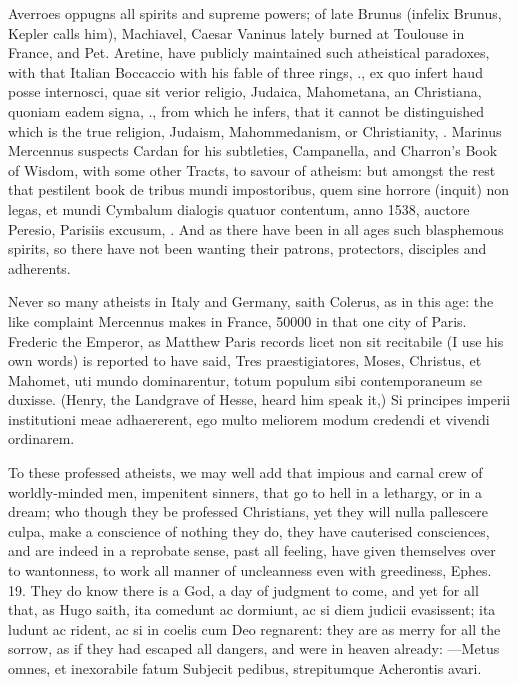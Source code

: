 {Averroes oppugns all spirits and supreme powers; of late Brunus
(infelix Brunus, Kepler calls him), Machiavel, Caesar Vaninus
lately burned at Toulouse in France, and Pet. Aretine, have publicly
maintained such atheistical paradoxes, with that Italian
Boccaccio with his fable of three rings, \etc{}., ex quo infert haud posse
internosci, quae sit verior religio, Judaica, Mahometana, an
Christiana, quoniam eadem signa, \etc{}., from which he infers, that it
cannot be distinguished which is the true religion, Judaism,
Mahommedanism, or Christianity, \etc{}. Marinus Mercennus suspects
Cardan for his subtleties, Campanella, and Charron's Book of Wisdom,
with some other Tracts, to savour of atheism: but amongst the
rest that pestilent book de tribus mundi impostoribus, quem sine
horrore (inquit) non legas, et mundi Cymbalum dialogis quatuor
contentum, anno 1538, auctore Peresio, Parisiis excusum, \etc{}. And
as there have been in all ages such blasphemous spirits, so there have
not been wanting their patrons, protectors, disciples and adherents.

Never so many atheists in Italy and Germany, saith Colerus, as in
this age: the like complaint Mercennus makes in France, 50\thinspace{}000 in that
one city of Paris. Frederic the Emperor, as Matthew Paris records
licet non sit recitabile (I use his own words) is reported to have
said, Tres praestigiatores, Moses, Christus, et Mahomet, uti mundo
dominarentur, totum populum sibi contemporaneum se duxisse. (Henry, the
Landgrave of Hesse, heard him speak it,) Si principes imperii
institutioni meae adhaererent, ego multo meliorem modum credendi et
vivendi ordinarem.

To these professed atheists, we may well add that impious and carnal
crew of worldly-minded men, impenitent sinners, that go to hell in a
lethargy, or in a dream; who though they be professed Christians, yet
they will nulla pallescere culpa, make a conscience of nothing they do,
they have cauterised consciences, and are indeed in a reprobate sense,
past all feeling, have given themselves over to wantonness, to work all
manner of uncleanness even with greediness, Ephes.  19. They do know
there is a God, a day of judgment to come, and yet for all that, as
Hugo saith, ita comedunt ac dormiunt, ac si diem judicii evasissent;
ita ludunt ac rident, ac si in coelis cum Deo regnarent: they are as
merry for all the sorrow, as if they had escaped all dangers, and were
in heaven already:
---Metus omnes, et inexorabile fatum
Subjecit pedibus, strepitumque Acherontis avari.

}
